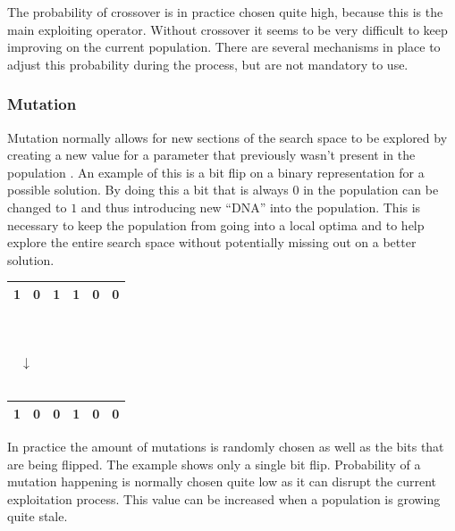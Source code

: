 The probability of crossover is in practice chosen quite high, because this is the main exploiting operator.
Without crossover it seems to be very difficult to keep improving on the current population.
There are several mechanisms in place to adjust this probability during the process, but are not mandatory to use.

\subsubsection*{Mutation}
Mutation normally allows for new sections of the search space to be explored by creating a new value for a parameter that previously wasn't present in the population \cite{genetics}.
An example of this is a bit flip on a binary representation for a possible solution.
By doing this a bit that is always $0$ in the population can be changed to $1$ and thus introducing new ``DNA'' into the population.
This is necessary to keep the population from going into a local optima and to help explore the entire search space without potentially missing out on a better solution. \\

\begin{center}
\begin{tabular}{|c|c|c|c|c|c|}
\hline
1 & 0 & \textbf{1} & 1 & 0 & 0 \\ 
\hline
\end{tabular}
\\
$\:$ \\
$\quad \downarrow \: \qquad \:$ \\
$\:$ \\
\begin{tabular}{|c|c|c|c|c|c|}
\hline
1 & 0 & \textbf{0} & 1 & 0 & 0 \\ \hline
\end{tabular}
\end{center}

In practice the amount of mutations is randomly chosen as well as the bits that are being flipped.
The example shows only a single bit flip.
Probability of a mutation happening is normally chosen quite low as it can disrupt the current exploitation process.
This value can be increased when a population is growing quite stale.